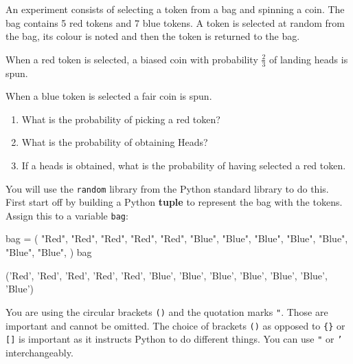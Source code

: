 An experiment consists of selecting a token from a bag and spinning a coin. The
bag contains 5 red tokens and 7 blue tokens. A token is selected at random from
the bag, its colour is noted and then the token is returned to the bag.


When a red token is selected, a biased coin with probability \(\frac{2}{3}\)
of landing heads is spun.


When a blue token is selected a fair coin is spun.
\begin{enumerate}

\item 

What is the probability of picking a red token?

\item 

What is the probability of obtaining Heads?

\item 

If a heads is obtained, what is the probability of having selected a red
token.

\end{enumerate}



You will use the \texttt{random} library from the Python standard library to do this.
First start off by building a Python \textbf{tuple} to represent the bag with the
tokens. Assign this to a variable \texttt{bag}:


\begin{pyin}
bag = (
    "Red",
    "Red",
    "Red",
    "Red",
    "Red",
    "Blue",
    "Blue",
    "Blue",
    "Blue",
    "Blue",
    "Blue",
    "Blue",
)
bag
\end{pyin}





\begin{raw}
('Red',
 'Red',
 'Red',
 'Red',
 'Red',
 'Blue',
 'Blue',
 'Blue',
 'Blue',
 'Blue',
 'Blue',
 'Blue')
\end{raw}






\begin{note}
You are using the circular brackets \texttt{()} and the quotation marks
\texttt{"}. Those are important and cannot be omitted. The choice of brackets
\texttt{()} as opposed to \texttt{\{\}} or \texttt{[]} is important as it instructs Python to do
different things. You can use \texttt{"} or \texttt{'}
interchangeably.
\end{note}



